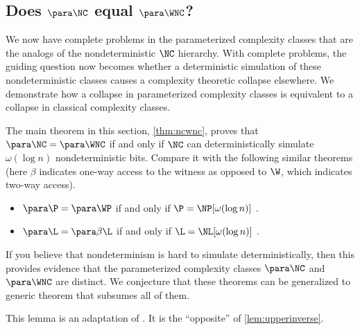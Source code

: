 \subsection{Does \texorpdfstring{$\para \NC$}{paraNC} equal \texorpdfstring{$\para \WNC$}{paraWNC}?}
\label{sec:ncwnc}

%
%
%
We now have complete problems in the parameterized complexity classes that are the analogs of the nondeterministic $\NC$ hierarchy.
%
%
%
With complete problems, the guiding question now becomes whether a deterministic simulation of these nondeterministic classes causes a complexity theoretic collapse elsewhere.
%
%
%
We demonstrate how a collapse in parameterized complexity classes is equivalent to a collapse in classical complexity classes.
%
%
%

%
%
%
%
The main theorem in this section, \autoref{thm:ncwnc}, proves that $\para \NC = \para \WNC$ if and only if $\NC$ can deterministically simulate $\omega(\log n)$ nondeterministic bits.
%
%
%
Compare it with the following similar theorems (here $\beta$ indicates one-way access to the witness as opposed to $\W$, which indicates two-way access).
\begin{itemize}
\item $\para \P = \para \WP$ if and only if $\P = \NP[\omega(\log n)]$ \autocite[Theorem~3.29]{fg06}.
\item $\para \L = \para \beta \L$ if and only if $\L = \NL[\omega(\log n)]$ \autocite[Theorem~15]{cm14}.
\end{itemize}
If you believe that nondeterminism is hard to simulate deterministically, then this provides evidence that the parameterized complexity classes $\para \NC$ and $\para \WNC$ are distinct.
%
%
We conjecture that these theorems can be generalized to generic theorem that subsumes all of them.

This lemma is an adaptation of \autocite[Lemma~3.24]{fg06}.
It is the ``opposite'' of \autoref{lem:upperinverse}.

